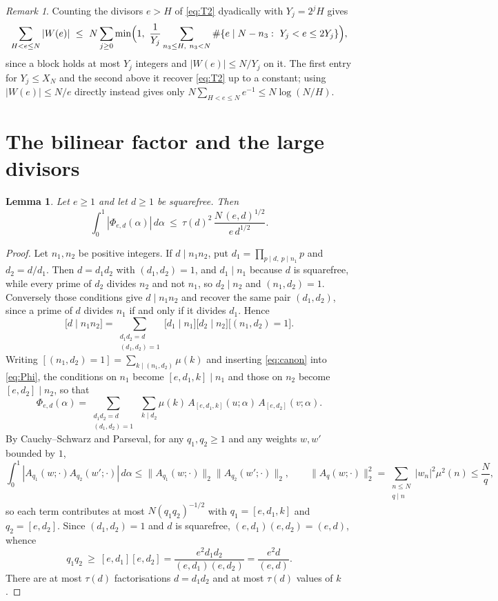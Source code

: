 \documentclass[11pt,a4paper]{article}
\theoremstyle{plain}
\newtheorem{lemma}[theorem]{Lemma}
\theoremstyle{remark}
\newtheorem{remark}[theorem]{Remark}
\newcommand{\lcm}[1]{[#1]}
\begin{document}
\begin{remark}\label{rem:dyadic}
Counting the divisors $e>H$ of \eqref{eq:T2} dyadically with $Y_j=2^{j}H$ gives
\[
  \sum_{H<e\le N}|W(e)|\ \le\ N\sum_{j\ge0}\min\Bigl(1,\
  \frac1{Y_j}\sum_{n_3\le H,\ n_3<N}\#\{e\mid N-n_3:\ Y_j<e\le 2Y_j\}\Bigr),
\]
since a block holds at most $Y_j$ integers and $|W(e)|\le N/Y_j$ on it. The first entry for
$Y_j\le X_N$ and the second above it recover \eqref{eq:T2} up to a constant; using
$|W(e)|\le N/e$ directly instead gives only $N\sum_{H<e\le N}e^{-1}\le N\log(N/H)$.
\end{remark}

\section{The bilinear factor and the large divisors}\label{sec:bilinear}

\begin{lemma}\label{lem:L1}
Let $e\ge1$ and let $d\ge1$ be squarefree. Then
\[
  \int_0^1|\Phi_{e,d}(\alpha)|\,d\alpha\ \le\ \tau(d)^{2}\,\frac{N\,(e,d)^{1/2}}{e\,d^{1/2}}.
\]
\end{lemma}

\begin{proof}
Let $n_1,n_2$ be positive integers. If $d\mid n_1n_2$, put $d_1=\prod_{p\mid d,\ p\mid n_1}p$ and
$d_2=d/d_1$. Then $d=d_1d_2$ with $(d_1,d_2)=1$, and $d_1\mid n_1$ because $d$ is squarefree, while
every prime of $d_2$ divides $n_2$ and not $n_1$, so $d_2\mid n_2$ and $(n_1,d_2)=1$. Conversely those
conditions give $d\mid n_1n_2$ and recover the same pair $(d_1,d_2)$, since a prime of $d$ divides
$n_1$ if and only if it divides $d_1$. Hence
\begin{equation}\label{eq:canon}
  \bigl[d\mid n_1n_2\bigr]=\sum_{\substack{d_1d_2=d\\ (d_1,d_2)=1}}
  \bigl[d_1\mid n_1\bigr]\bigl[d_2\mid n_2\bigr]\bigl[(n_1,d_2)=1\bigr].
\end{equation}
Writing $[(n_1,d_2)=1]=\sum_{k\mid(n_1,d_2)}\mu(k)$ and inserting \eqref{eq:canon} into
\eqref{eq:Phi}, the conditions on $n_1$ become $\lcm{e,d_1,k}\mid n_1$ and those on $n_2$ become
$\lcm{e,d_2}\mid n_2$, so that
\[
  \Phi_{e,d}(\alpha)=\sum_{\substack{d_1d_2=d\\ (d_1,d_2)=1}}\ \sum_{k\mid d_2}\mu(k)\,
  A_{\lcm{e,d_1,k}}(u;\alpha)\,A_{\lcm{e,d_2}}(v;\alpha).
\]
By Cauchy--Schwarz and Parseval, for any $q_1,q_2\ge1$ and any weights $w,w'$ bounded by $1$,
\[
  \int_0^1|A_{q_1}(w;\cdot)A_{q_2}(w';\cdot)|\,d\alpha\le\|A_{q_1}(w;\cdot)\|_2\|A_{q_2}(w';\cdot)\|_2,
  \qquad \|A_q(w;\cdot)\|_2^{2}=\sum_{\substack{n\le N\\ q\mid n}}|w_n|^{2}\mu^{2}(n)\le\frac Nq,
\]
so each term contributes at most $N(q_1q_2)^{-1/2}$ with $q_1=\lcm{e,d_1,k}$ and $q_2=\lcm{e,d_2}$.
Since $(d_1,d_2)=1$ and $d$ is squarefree, $(e,d_1)(e,d_2)=(e,d)$, whence
\[
  q_1q_2\ \ge\ \lcm{e,d_1}\lcm{e,d_2}=\frac{e^{2}d_1d_2}{(e,d_1)(e,d_2)}=\frac{e^{2}d}{(e,d)}.
\]
There are at most $\tau(d)$ factorisations $d=d_1d_2$ and at most $\tau(d)$ values of $k$.
\end{proof}
\end{document}
